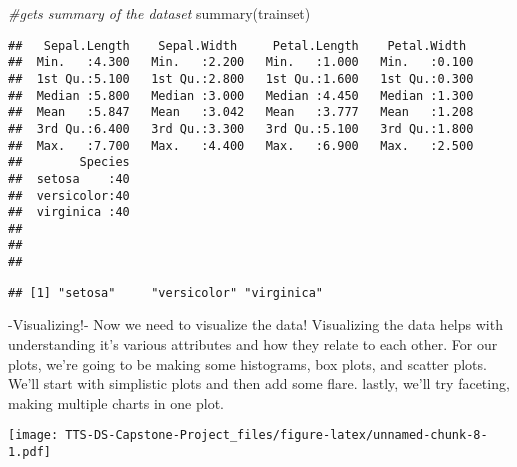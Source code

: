 \documentclass[
]{article}
\newenvironment{Shaded}{\begin{snugshade}}{\end{snugshade}}
\newcommand{\CommentTok}[1]{\textcolor[rgb]{0.56,0.35,0.01}{\textit{#1}}}
\newcommand{\FunctionTok}[1]{\textcolor[rgb]{0.00,0.00,0.00}{#1}}
\newcommand{\NormalTok}[1]{#1}
\newcommand{\SpecialCharTok}[1]{\textcolor[rgb]{0.00,0.00,0.00}{#1}}
\begin{document}
\begin{Shaded}
\begin{Highlighting}[]
\CommentTok{\#gets summary of the dataset}
\FunctionTok{summary}\NormalTok{(trainset)}
\end{Highlighting}
\end{Shaded}

\begin{verbatim}
##   Sepal.Length    Sepal.Width     Petal.Length    Petal.Width   
##  Min.   :4.300   Min.   :2.200   Min.   :1.000   Min.   :0.100  
##  1st Qu.:5.100   1st Qu.:2.800   1st Qu.:1.600   1st Qu.:0.300  
##  Median :5.800   Median :3.000   Median :4.450   Median :1.300  
##  Mean   :5.847   Mean   :3.042   Mean   :3.777   Mean   :1.208  
##  3rd Qu.:6.400   3rd Qu.:3.300   3rd Qu.:5.100   3rd Qu.:1.800  
##  Max.   :7.700   Max.   :4.400   Max.   :6.900   Max.   :2.500  
##        Species  
##  setosa    :40  
##  versicolor:40  
##  virginica :40  
##                 
##                 
## 
\end{verbatim}

\begin{Shaded}
\end{Shaded}

\begin{verbatim}
## [1] "setosa"     "versicolor" "virginica"
\end{verbatim}

-Visualizing!- Now we need to visualize the data! Visualizing the data
helps with understanding it's various attributes and how they relate to
each other. For our plots, we're going to be making some histograms, box
plots, and scatter plots. We'll start with simplistic plots and then add
some flare. lastly, we'll try faceting, making multiple charts in one
plot.

\begin{Shaded}
\end{Shaded}

\texttt{[image: TTS-DS-Capstone-Project\_files/figure-latex/unnamed-chunk-8-1.pdf]}
\end{document}

